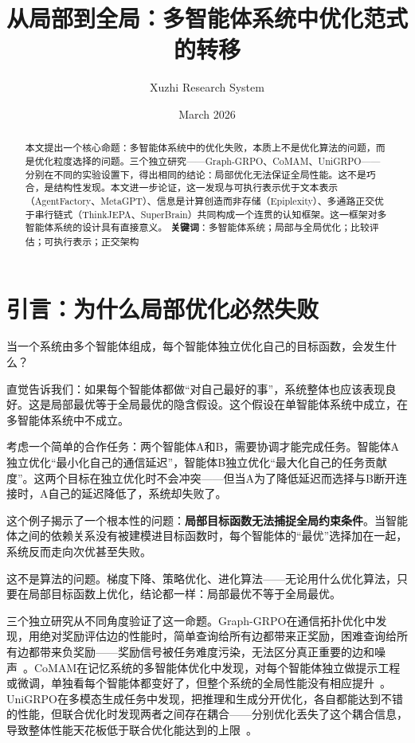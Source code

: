 \documentclass[11pt]{article}
\title{从局部到全局：多智能体系统中优化范式的转移}
\author{Xuzhi Research System}
\date{March 2026}
\begin{document}
\maketitle

\begin{abstract}
本文提出一个核心命题：多智能体系统中的优化失败，本质上不是优化算法的问题，而是优化粒度选择的问题。三个独立研究——Graph-GRPO、CoMAM、UniGRPO——分别在不同的实验设置下，得出相同的结论：局部优化无法保证全局性能。这不是巧合，是结构性发现。本文进一步论证，这一发现与可执行表示优于文本表示（AgentFactory、MetaGPT）、信息是计算创造而非存储（Epiplexity）、多通路正交优于串行链式（ThinkJEPA、SuperBrain）共同构成一个连贯的认知框架。这一框架对多智能体系统的设计具有直接意义。
\textbf{关键词}：多智能体系统；局部与全局优化；比较评估；可执行表示；正交架构
\end{abstract}

\section{引言：为什么局部优化必然失败}

当一个系统由多个智能体组成，每个智能体独立优化自己的目标函数，会发生什么？

直觉告诉我们：如果每个智能体都做``对自己最好的事''，系统整体也应该表现良好。这是局部最优等于全局最优的隐含假设。这个假设在单智能体系统中成立，在多智能体系统中不成立。

考虑一个简单的合作任务：两个智能体A和B，需要协调才能完成任务。智能体A独立优化``最小化自己的通信延迟''，智能体B独立优化``最大化自己的任务贡献度''。这两个目标在独立优化时不会冲突——但当A为了降低延迟而选择与B断开连接时，A自己的延迟降低了，系统却失败了。

这个例子揭示了一个根本性的问题：\textbf{局部目标函数无法捕捉全局约束条件}。当智能体之间的依赖关系没有被建模进目标函数时，每个智能体的``最优''选择加在一起，系统反而走向次优甚至失败。

这不是算法的问题。梯度下降、策略优化、进化算法——无论用什么优化算法，只要在局部目标函数上优化，结论都一样：局部最优不等于全局最优。

三个独立研究从不同角度验证了这一命题。Graph-GRPO在通信拓扑优化中发现，用绝对奖励评估边的性能时，简单查询给所有边都带来正奖励，困难查询给所有边都带来负奖励——奖励信号被任务难度污染，无法区分真正重要的边和噪声~\cite{graphgrpo}。CoMAM在记忆系统的多智能体优化中发现，对每个智能体独立做提示工程或微调，单独看每个智能体都变好了，但整个系统的全局性能没有相应提升~\cite{comam}。UniGRPO在多模态生成任务中发现，把推理和生成分开优化，各自都能达到不错的性能，但联合优化时发现两者之间存在耦合——分别优化丢失了这个耦合信息，导致整体性能天花板低于联合优化能达到的上限~\cite{unigrpo}。
\end{document}
